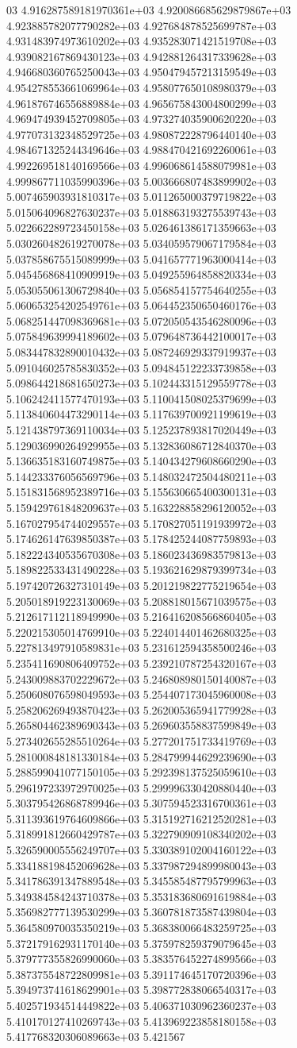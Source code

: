 03	4.916287589181970361e+03	4.920086685629879867e+03	4.923885782077790282e+03	4.927684878525699787e+03	4.931483974973610202e+03	4.935283071421519708e+03	4.939082167869430123e+03	4.942881264317339628e+03	4.946680360765250043e+03	4.950479457213159549e+03	4.954278553661069964e+03	4.958077650108980379e+03	4.961876746556889884e+03	4.965675843004800299e+03	4.969474939452709805e+03	4.973274035900620220e+03	4.977073132348529725e+03	4.980872228796440140e+03	4.984671325244349646e+03	4.988470421692260061e+03	4.992269518140169566e+03	4.996068614588079981e+03	4.999867711035990396e+03	5.003666807483899902e+03	5.007465903931810317e+03	5.011265000379719822e+03	5.015064096827630237e+03	5.018863193275539743e+03	5.022662289723450158e+03	5.026461386171359663e+03	5.030260482619270078e+03	5.034059579067179584e+03	5.037858675515089999e+03	5.041657771963000414e+03	5.045456868410909919e+03	5.049255964858820334e+03	5.053055061306729840e+03	5.056854157754640255e+03	5.060653254202549761e+03	5.064452350650460176e+03	5.068251447098369681e+03	5.072050543546280096e+03	5.075849639994189602e+03	5.079648736442100017e+03	5.083447832890010432e+03	5.087246929337919937e+03	5.091046025785830352e+03	5.094845122233739858e+03	5.098644218681650273e+03	5.102443315129559778e+03	5.106242411577470193e+03	5.110041508025379699e+03	5.113840604473290114e+03	5.117639700921199619e+03	5.121438797369110034e+03	5.125237893817020449e+03	5.129036990264929955e+03	5.132836086712840370e+03	5.136635183160749875e+03	5.140434279608660290e+03	5.144233376056569796e+03	5.148032472504480211e+03	5.151831568952389716e+03	5.155630665400300131e+03	5.159429761848209637e+03	5.163228858296120052e+03	5.167027954744029557e+03	5.170827051191939972e+03	5.174626147639850387e+03	5.178425244087759893e+03	5.182224340535670308e+03	5.186023436983579813e+03	5.189822533431490228e+03	5.193621629879399734e+03	5.197420726327310149e+03	5.201219822775219654e+03	5.205018919223130069e+03	5.208818015671039575e+03	5.212617112118949990e+03	5.216416208566860405e+03	5.220215305014769910e+03	5.224014401462680325e+03	5.227813497910589831e+03	5.231612594358500246e+03	5.235411690806409752e+03	5.239210787254320167e+03	5.243009883702229672e+03	5.246808980150140087e+03	5.250608076598049593e+03	5.254407173045960008e+03	5.258206269493870423e+03	5.262005365941779928e+03	5.265804462389690343e+03	5.269603558837599849e+03	5.273402655285510264e+03	5.277201751733419769e+03	5.281000848181330184e+03	5.284799944629239690e+03	5.288599041077150105e+03	5.292398137525059610e+03	5.296197233972970025e+03	5.299996330420880440e+03	5.303795426868789946e+03	5.307594523316700361e+03	5.311393619764609866e+03	5.315192716212520281e+03	5.318991812660429787e+03	5.322790909108340202e+03	5.326590005556249707e+03	5.330389102004160122e+03	5.334188198452069628e+03	5.337987294899980043e+03	5.341786391347889548e+03	5.345585487795799963e+03	5.349384584243710378e+03	5.353183680691619884e+03	5.356982777139530299e+03	5.360781873587439804e+03	5.364580970035350219e+03	5.368380066483259725e+03	5.372179162931170140e+03	5.375978259379079645e+03	5.379777355826990060e+03	5.383576452274899566e+03	5.387375548722809981e+03	5.391174645170720396e+03	5.394973741618629901e+03	5.398772838066540317e+03	5.402571934514449822e+03	5.406371030962360237e+03	5.410170127410269743e+03	5.413969223858180158e+03	5.417768320306089663e+03	5.421567